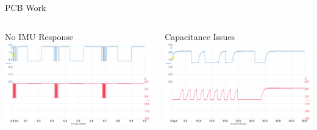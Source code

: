 \begin{frame}{PCB Work}
    \begin{columns}
        \begin{column}{0.5\textwidth}
            No IMU Response
            \includegraphics[height=1\textheight,width=1\textwidth,keepaspectratio]{images/IMU_SDA_SCL_NoData.png}
        \end{column}
        \begin{column}{0.5\textwidth}
            Capacitance Issues
            \includegraphics[height=1\textheight,width=1\textwidth,keepaspectratio]{images/PreResistorChange_Both.png}
        \end{column}
    \end{columns}
\end{frame}
